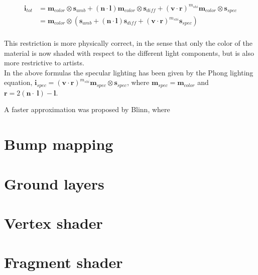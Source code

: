 \begin{displaymath}
  \begin{array}{rl}
    \mathbf{i}_{tot} &= \mathbf{m}_{color} \otimes \mathbf{s}_{amb} + (\mathbf{n} \cdot
    \mathbf{l}) \mathbf{m}_{color} \otimes \mathbf{s}_{diff} +
    (\mathbf{v} \cdot \mathbf{r})^{m_{shi}} \mathbf{m}_{color} \otimes
    \mathbf{s}_{spec} \\
    &= \mathbf{m}_{color} \otimes (\mathbf{s}_{amb} + (\mathbf{n} \cdot
    \mathbf{l}) \mathbf{s}_{diff} + (\mathbf{v} \cdot
    \mathbf{r})^{m_{shi}} \mathbf{s}_{spec}) \\
  \end{array}
\end{displaymath}

This restriction is more physically correct, in the sense that only
the color of the material is now shaded with respect to the different
light components, but is also more restrictive to artists.\\

In the above formulas the specular lighting has been given by the
Phong lighting equation, $\mathbf{i}_{spec} = (\mathbf{v} \cdot
\mathbf{r})^{m_{shi}} \mathbf{m}_{spec} \otimes \mathbf{s}_{spec}$,
where $\mathbf{m}_{spec} = \mathbf{m}_{color}$ and $\mathbf{r} = 2
(\mathbf{n} \cdot \ \mathbf{l}) - \mathbf{l}$.

A faster approximation was proposed by Blinn, where


\section{Bump mapping}



\section{Ground layers}



\section{Vertex shader}



\section{Fragment shader}

